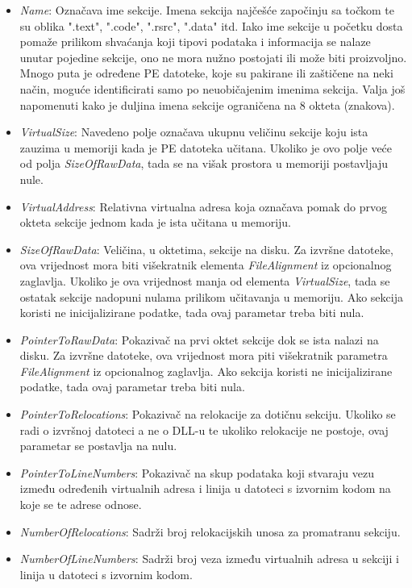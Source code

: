 \documentclass[times, utf8, diplomski, numeric]{fer}
\begin{document}
\begin{itemize}
\item \emph{Name}: Označava ime sekcije. Imena sekcija najčešće započinju sa točkom te su oblika ".text", ".code", ".rsrc", ".data" itd. Iako ime sekcije u početku dosta pomaže prilikom shvaćanja koji tipovi podataka i informacija se nalaze unutar pojedine sekcije, ono ne mora nužno postojati ili može biti proizvoljno. Mnogo puta je određene PE datoteke, koje su pakirane ili zaštičene na neki način, moguće identificirati samo po neuobičajenim imenima sekcija. Valja još napomenuti kako je duljina imena sekcije ograničena na 8 okteta (znakova).
\item \emph{VirtualSize}: Navedeno polje označava ukupnu veličinu sekcije koju ista zauzima u memoriji kada je PE datoteka učitana. Ukoliko je ovo polje veće od polja \emph{SizeOfRawData}, tada se na višak prostora u memoriji postavljaju nule.
\item \emph{VirtualAddress}: Relativna virtualna adresa koja označava pomak do prvog okteta sekcije jednom kada je ista učitana u memoriju.
\item \emph{SizeOfRawData}: Veličina, u oktetima, sekcije na disku. Za izvršne datoteke, ova vrijednost mora biti višekratnik elementa \emph{FileAlignment} iz opcionalnog zaglavlja. Ukoliko je ova vrijednost manja od elementa \emph{VirtualSize}, tada se ostatak sekcije nadopuni nulama prilikom učitavanja u memoriju. Ako sekcija koristi ne inicijalizirane podatke, tada ovaj parametar treba biti nula.
\item \emph{PointerToRawData}: Pokazivač na prvi oktet sekcije dok se ista nalazi na disku. Za izvršne datoteke, ova vrijednost mora piti višekratnik parametra \emph{FileAlignment} iz opcionalnog zaglavlja. Ako sekcija koristi ne inicijalizirane podatke, tada ovaj parametar treba biti nula.
\item \emph{PointerToRelocations}: Pokazivač na relokacije za dotičnu sekciju. Ukoliko se radi o izvršnoj datoteci a ne o DLL-u te ukoliko relokacije ne postoje, ovaj parametar se postavlja na nulu.
\item \emph{PointerToLineNumbers}: Pokazivač na skup podataka koji stvaraju vezu između određenih virtualnih adresa i linija u datoteci s izvornim kodom na koje se te adrese odnose.
\item \emph{NumberOfRelocations}: Sadrži broj relokacijskih unosa za promatranu sekciju.
\item \emph{NumberOfLineNumbers}: Sadrži broj veza između virtualnih adresa u sekciji i linija u datoteci s izvornim kodom.

\end{itemize}
\end{document}
